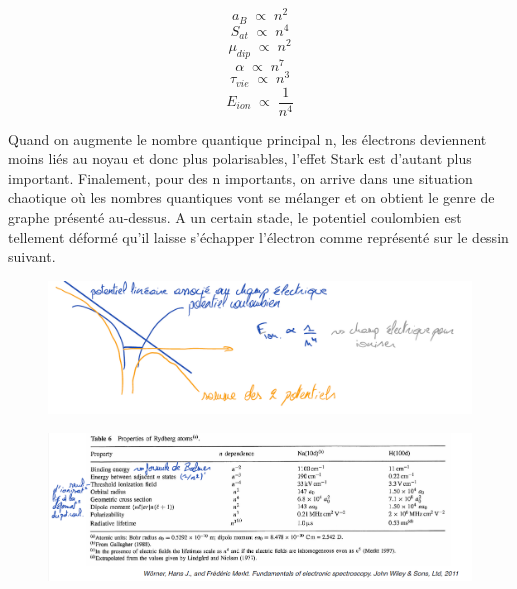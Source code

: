 \begin{equation*}
    a_B \; \propto\; n^2
\end{equation*}
\begin{equation*}
    S_{at} \; \propto\; n^4
\end{equation*}
\begin{equation*}
    \mu_{dip} \; \propto\; n^2
\end{equation*}
\begin{equation*}
    \alpha \; \propto\; n^7
\end{equation*}
\begin{equation*}
    \tau_{vie} \; \propto\; n^3
\end{equation*}
\begin{equation*}
    E_{ion} \; \propto\; \dfrac{1}{n^4}
\end{equation*}

Quand on augmente le nombre quantique principal n, les électrons deviennent moins liés au noyau et donc plus polarisables, l'effet Stark est d'autant plus important. Finalement, pour des n importants, on arrive dans une situation chaotique où les nombres quantiques vont se mélanger et on obtient le genre de graphe présenté au-dessus. A un certain stade, le potentiel coulombien est tellement déformé qu'il laisse s'échapper l'électron comme représenté sur le dessin suivant.\\

\begin{figure}[tph]
    \centering
    \includegraphics[width=\textwidth]{Images2/DessinStark.PNG}
\end{figure}
\begin{figure}[tph]
    \centering
    \includegraphics[width=\textwidth]{Images2/TableauStark.PNG}
\end{figure}



